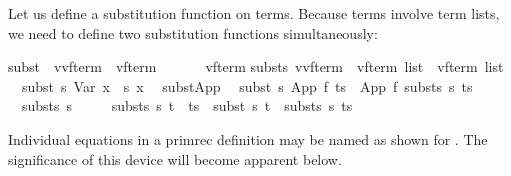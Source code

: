 \begin{isabellebody}
\begin{isamarkuptext}
Let us define a substitution function on terms. Because terms involve term
lists, we need to define two substitution functions simultaneously:%
\end{isamarkuptext}%
\isanewline
subst\ {\isacharcolon}{\isacharcolon}\ {\isachardoublequote}{\isacharparenleft}{\isacharprime}v{\isasymRightarrow}{\isacharparenleft}{\isacharprime}v{\isacharcomma}{\isacharprime}f{\isacharparenright}term{\isacharparenright}\ {\isasymRightarrow}\ {\isacharparenleft}{\isacharprime}v{\isacharcomma}{\isacharprime}f{\isacharparenright}term\ \ \ \ \ \ {\isasymRightarrow}\ {\isacharparenleft}{\isacharprime}v{\isacharcomma}{\isacharprime}f{\isacharparenright}term{\isachardoublequote}\isanewline
substs{\isacharcolon}{\isacharcolon}\ {\isachardoublequote}{\isacharparenleft}{\isacharprime}v{\isasymRightarrow}{\isacharparenleft}{\isacharprime}v{\isacharcomma}{\isacharprime}f{\isacharparenright}term{\isacharparenright}\ {\isasymRightarrow}\ {\isacharparenleft}{\isacharprime}v{\isacharcomma}{\isacharprime}f{\isacharparenright}term\ list\ {\isasymRightarrow}\ {\isacharparenleft}{\isacharprime}v{\isacharcomma}{\isacharprime}f{\isacharparenright}term\ list{\isachardoublequote}\isanewline
\isanewline
{}\isanewline
\ \ {\isachardoublequote}subst\ s\ {\isacharparenleft}Var\ x{\isacharparenright}\ {\isacharequal}\ s\ x{\isachardoublequote}\isanewline
\ \ subst{\isacharunderscore}App{\isacharcolon}\isanewline
\ \ {\isachardoublequote}subst\ s\ {\isacharparenleft}App\ f\ ts{\isacharparenright}\ {\isacharequal}\ App\ f\ {\isacharparenleft}substs\ s\ ts{\isacharparenright}{\isachardoublequote}\isanewline
\isanewline
\ \ {\isachardoublequote}substs\ s\ {\isacharbrackleft}{\isacharbrackright}\ {\isacharequal}\ {\isacharbrackleft}{\isacharbrackright}{\isachardoublequote}\isanewline
\ \ {\isachardoublequote}substs\ s\ {\isacharparenleft}t\ {\isacharhash}\ ts{\isacharparenright}\ {\isacharequal}\ subst\ s\ t\ {\isacharhash}\ substs\ s\ ts{\isachardoublequote}%
\begin{isamarkuptext}%
\noindent
Individual equations in a primrec definition may be named as shown for .
The significance of this device will become apparent below.


\end{isamarkuptext}
\end{isabellebody}
